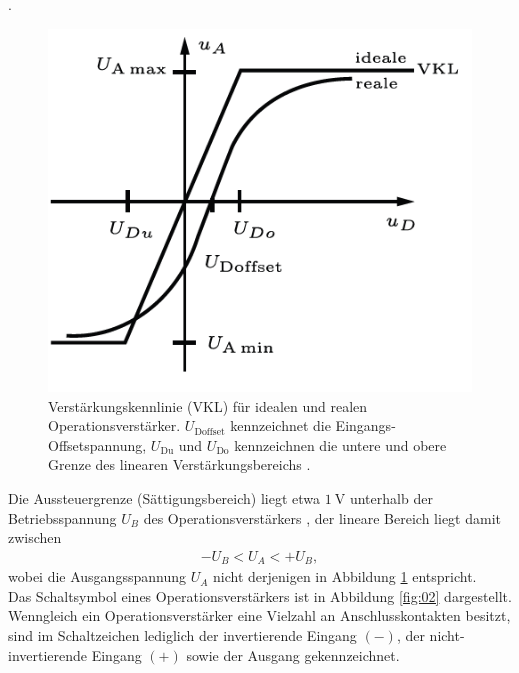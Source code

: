 \cite{hs-fulda}. \\
\FloatBarrier
\begin{figure}
  \centering
  \includegraphics[scale=0.8]{ressources/figure_01.png}
  \caption{Verstärkungskennlinie (VKL) für idealen und realen Operationsverstärker. $U_\text{Doffset}$
  kennzeichnet die Eingangs-Offsetspannung, $U_\text{Du}$ und $U_\text{Do}$ kennzeichnen
  die untere und obere Grenze des linearen Verstärkungsbereichs \cite{elektrotechnik}.}
  \label{fig:01}
\end{figure}
\FloatBarrier
\noindent Die Aussteuergrenze (Sättigungsbereich) liegt etwa $\SI{1}{\volt}$
unterhalb der Betriebsspannung $U_B$ des Operationsverstärkers \cite{federau}, der
lineare Bereich liegt damit zwischen
\begin{align}
  - U_B < U_A < + U_B,
  \label{eqn:02}
\end{align}
\noindent wobei die Ausgangsspannung $U_A$ nicht derjenigen in Abbildung \ref{fig:01}
entspricht. \\
\newline
\noindent Das Schaltsymbol eines Operationsverstärkers ist in Abbildung \ref{fig:02}
dargestellt. Wenngleich ein Operationsverstärker eine Vielzahl an
Anschlusskontakten besitzt, sind im Schaltzeichen lediglich der
invertierende Eingang $(-)$, der nicht-invertierende Eingang $(+)$ sowie der
Ausgang gekennzeichnet.
